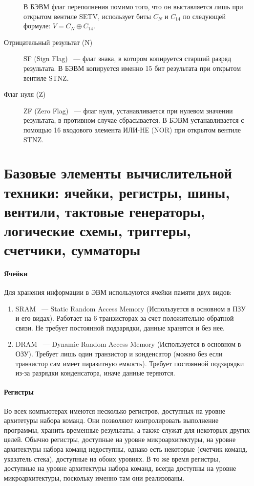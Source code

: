 \documentclass[10pt]{article}
\begin{document}
\begin{description}
\begin{itemize}
		\end{itemize}
		В БЭВМ флаг переполнения помимо того, что он выставляется лишь при открытом вентиле SETV, использует биты $C_N$ и $C_{14}$ по следующей формуле: $V = C_N \oplus C_{14}$.
		\item[Отрицательный результат (N)] SF (Sign Flag) ~--- флаг знака, в котором копируется старший разряд результата. В БЭВМ копируется именно 15 бит результата при открытом вентиле STNZ.
		\item[Флаг нуля (Z)] ZF (Zero Flag) ~--- флаг нуля, устанавливается при нулевом значении результата, в противном случае сбрасывается. В БЭВМ устанавливается с помощью 16 входового элемента ИЛИ-НЕ (NOR) при открытом вентиле STNZ.
	\end{description}
	\section{Базовые элементы вычислительной техники: ячейки, регистры, шины, вентили, тактовые генераторы, логические схемы, триггеры, счетчики, сумматоры}
	\paragraph{Ячейки}
	Для хранения информации в ЭВМ используются ячейки памяти двух видов:
	\begin{enumerate}
		\item SRAM ~--- Static Random Access Memory (Используется в основном в ПЗУ и его видах). Работает на 6 транзисторах за счет положительно-обратной связи. Не требует постоянной подзарядки, данные хранятся и без нее.
		\item DRAM ~--- Dynamic Random Access Memory (Используется в основном в ОЗУ). Требует лишь один транзистор и конденсатор (можно без если транзистор сам имеет паразитную емкость). Требует постоянной подзарядки из-за разрядки конденсатора, иначе данные теряются.
	\end{enumerate}
	\paragraph{Регистры}
	Во всех компьютерах имеются несколько регистров, доступных на уровне архитетуры набора команд. Они позволяют контролировать выполнение программы, хранить временные результаты, а также служат для некоторых других целей. Обычно регистры, доступные на уровне микроархитектуры, на уровне архитектуры набора команд недоступны, однако есть некоторые (счетчик команд, указатель стека), доступные на обоих уровнях. В то же время регистры, доступные на уровне архитектуры набора команд, всегда доступны на уровне микроархитектуры, поскольку именно там они реализованы.
\end{document}
